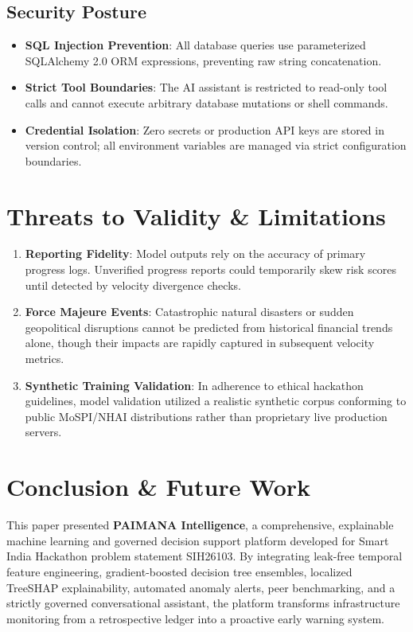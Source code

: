 \documentclass[conference]{IEEEtran}
\begin{document}
\subsection{Security Posture}
\begin{itemize}
    \item \textbf{SQL Injection Prevention}: All database queries use parameterized SQLAlchemy 2.0 ORM expressions, preventing raw string concatenation.
    \item \textbf{Strict Tool Boundaries}: The AI assistant is restricted to read-only tool calls and cannot execute arbitrary database mutations or shell commands.
    \item \textbf{Credential Isolation}: Zero secrets or production API keys are stored in version control; all environment variables are managed via strict configuration boundaries.
\end{itemize}

\section{Threats to Validity \& Limitations}
\begin{enumerate}
    \item \textbf{Reporting Fidelity}: Model outputs rely on the accuracy of primary progress logs. Unverified progress reports could temporarily skew risk scores until detected by velocity divergence checks.
    \item \textbf{Force Majeure Events}: Catastrophic natural disasters or sudden geopolitical disruptions cannot be predicted from historical financial trends alone, though their impacts are rapidly captured in subsequent velocity metrics.
    \item \textbf{Synthetic Training Validation}: In adherence to ethical hackathon guidelines, model validation utilized a realistic synthetic corpus conforming to public MoSPI/NHAI distributions rather than proprietary live production servers.
\end{enumerate}

\section{Conclusion \& Future Work}
This paper presented \textbf{PAIMANA Intelligence}, a comprehensive, explainable machine learning and governed decision support platform developed for Smart India Hackathon problem statement SIH26103. By integrating leak-free temporal feature engineering, gradient-boosted decision tree ensembles, localized TreeSHAP explainability, automated anomaly alerts, peer benchmarking, and a strictly governed conversational assistant, the platform transforms infrastructure monitoring from a retrospective ledger into a proactive early warning system.
\end{document}
